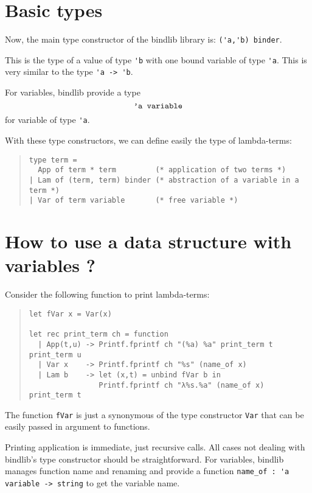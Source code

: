 \documentclass[11pt]{article}
\begin{document}
\section{Basic types}

Now, the main type constructor of the bindlib library is:
\verb!('a,'b) binder!.

This is the type of a value of type \verb!'b! with one bound
variable of type \verb!'a!. This is very similar to the type
 \verb!'a -> 'b!.

For variables, bindlib provide a type
$$\verb!'a variable!$$
for variable of type \verb!'a!.

With these type constructors, we can define easily the type of
lambda-terms:

\begin{quote}
\begin{verbatim}
type term =
  App of term * term         (* application of two terms *)
| Lam of (term, term) binder (* abstraction of a variable in a term *)
| Var of term variable       (* free variable *)
\end{verbatim}
\end{quote}

\section{How to use a data structure with variables ?}

Consider the following function to print lambda-terms:

\begin{quote}
\begin{verbatim}
let fVar x = Var(x)

let rec print_term ch = function
  | App(t,u) -> Printf.fprintf ch "(%a) %a" print_term t print_term u
  | Var x    -> Printf.fprintf ch "%s" (name_of x)
  | Lam b    -> let (x,t) = unbind fVar b in
                Printf.fprintf ch "λ%s.%a" (name_of x) print_term t
\end{verbatim}
\end{quote}

The function \verb!fVar! is just a synonymous of the type constructor
\verb!Var! that can be easily passed in argument to functions.

Printing application is immediate, just recursive calls. All cases not
dealing with bindlib's type constructor should be straightforward. For
variables, bindlib manages function name and renaming and provide a
function \verb!name_of : 'a variable -> string! to get the variable name.
\end{document}
